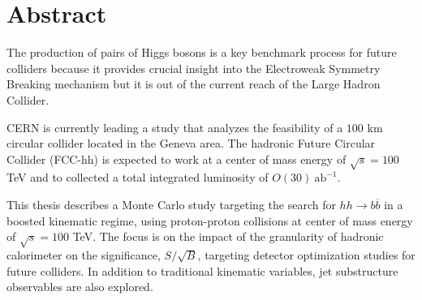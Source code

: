 
\section*{Abstract}


%

The production of pairs of Higgs bosons is a key benchmark process for future colliders because it provides crucial insight into the Electroweak Symmetry Breaking mechanism but it is out of the current reach of the Large Hadron Collider.

CERN is currently leading a study that analyzes the feasibility of a $100$ km circular collider located in the Geneva area. The hadronic Future Circular Collider (FCC-hh) is expected to work at a center of mass energy of $\sqrt{s}=100$ TeV and to collected a total integrated luminosity of $O(30)~\text{ab}^{-1}$.

This thesis describes a Monte Carlo study targeting the search for $hh\rightarrow b\overline{b}$ in a boosted kinematic regime, using proton-proton collisions at center of mass energy of $\sqrt{s}=100$ TeV. The focus is on the impact of the granularity of hadronic calorimeter on the significance, $S/\sqrt{B}$, targeting detector optimization studies for future colliders. In addition to traditional kinematic variables, jet substructure observables are also explored.

